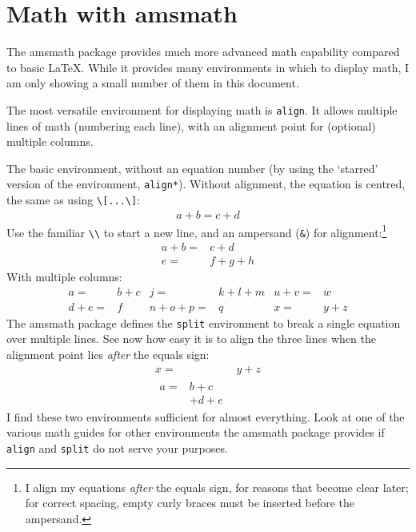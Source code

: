 \documentclass[12pt,article]{memoir}
\begin{document}
\chapter*{Math with \textsf{amsmath}}

The \textsf{amsmath} package provides much more advanced math capability compared to basic \LaTeX . While it provides many environments in which to display math, I am only showing a small number of them in this document.

The most versatile environment for displaying math is \texttt{align}. It allows multiple lines of math (numbering each line), with an alignment point for (optional) multiple columns.

The basic environment, without an equation number (by using the `starred' version of the environment, \verb|align*|). Without alignment, the equation is centred, the same as using \verb|\[...\]|:
\begin{align*}
	a + b = c + d
\end{align*}
%
Use the familiar \verb|\\| to start a new line, and an ampersand (\verb|&|) for alignment:\footnote{I align my equations \emph{after} the equals sign, for reasons that become clear later; for correct spacing, empty curly braces must be inserted before the ampersand.}
\begin{align}
	a + b = {}& c + d \\
	e = {}& f + g + h
\end{align}
%
With multiple columns:
\begin{align}
	a = {}& b + c 	&	j = {}& k + l + m 	&	u + v = {}& w \\
	d + e = {}& f 	&	n + o + p = {}& q 	&	x = {}& y + z
\end{align}
%
The \textsf{amsmath} package defines the \texttt{split} environment to break a single equation over multiple lines. See now how easy it is to align the three lines when the alignment point lies \emph{after} the equals sign:
\begin{align}
	x = {}& y + z \\
	\begin{split}
		a = {}& b + c \\
		{}& + d + e
	\end{split}
\end{align}
%
I find these two environments sufficient for almost everything. Look at one of the various math guides for other environments the \textsf{amsmath} package provides if \texttt{align} and \texttt{split} do not serve your purposes.
\end{document}
